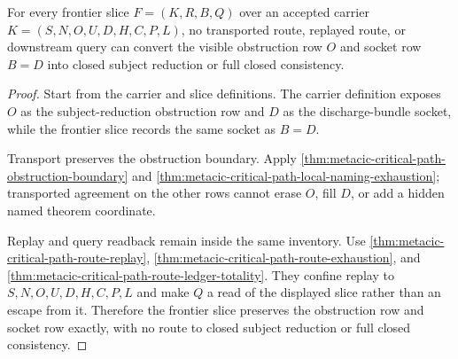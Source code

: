 \begin{theorem}
\label{thm:metacic-critical-path-nonescape}
For every frontier slice $F=(K,R,B,Q)$ over an accepted carrier $K=(S,N,O,U,D,H,C,P,L)$, no transported route, replayed route, or downstream query can convert the visible obstruction row $O$ and socket row $B=D$ into closed subject reduction or full closed consistency.
\end{theorem}
\begin{proof}
Start from the carrier and slice definitions. The carrier definition exposes $O$ as the subject-reduction obstruction row and $D$ as the discharge-bundle socket, while the frontier slice records the same socket as $B=D$.

Transport preserves the obstruction boundary. Apply \autoref{thm:metacic-critical-path-obstruction-boundary} and \autoref{thm:metacic-critical-path-local-naming-exhaustion}; transported agreement on the other rows cannot erase $O$, fill $D$, or add a hidden named theorem coordinate.

Replay and query readback remain inside the same inventory. Use \autoref{thm:metacic-critical-path-route-replay}, \autoref{thm:metacic-critical-path-route-exhaustion}, and \autoref{thm:metacic-critical-path-route-ledger-totality}. They confine replay to $S,N,O,U,D,H,C,P,L$ and make $Q$ a read of the displayed slice rather than an escape from it. Therefore the frontier slice preserves the obstruction row and socket row exactly, with no route to closed subject reduction or full closed consistency.
\end{proof}

